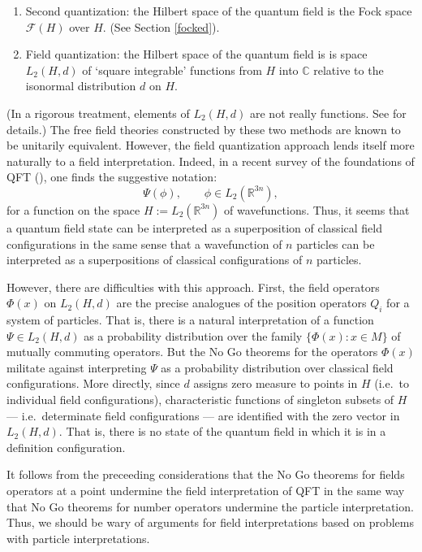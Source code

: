 \documentclass[12pt]{article}
\theoremstyle{definition}
\theoremstyle{definition}
\theoremstyle{remark}
\def\2#1{{\mathcal #1}}
\def\7#1{{\mathbb #1}}
\begin{document}
\begin{enumerate}
\item Second quantization: the Hilbert space of the quantum field is
  the Fock space $\2F (H)$ over $H$.  (See Section \ref{focked}).
\item Field quantization: the Hilbert space of the quantum field is is
  space $L_2(H ,d)$ of `square integrable' functions from $H$ into
  $\7C$ relative to the isonormal distribution $d$ on $H$.

\end{enumerate}
(In a rigorous treatment, elements of $L_2(H,d )$ are not really
functions.  See \cite[Section 1.3]{baez} for details.)  The free field
theories constructed by these two methods are known to be unitarily
equivalent.  However, the field quantization approach lends itself
more naturally to a field interpretation.  Indeed, in a recent survey
of the foundations of QFT (\cite{nhug}), one finds the suggestive
notation:
\[ \Psi (\phi ),\qquad \phi \in L_2(\7R ^{3n}) ,\] for a function on
the space $H:=L_2(\7R ^{3n})$ of wavefunctions. Thus, it seems that a
quantum field state can be interpreted as a superposition of classical
field configurations in the same sense that a wavefunction of $n$
particles can be interpreted as a superpositions of classical
configurations of $n$ particles.

However, there are difficulties with this approach.  First, the field
operators $\Phi (x)$ on $L_2(H ,d)$ are the precise analogues of the
position operators $Q_i$ for a system of particles.  That is, there is
a natural interpretation of a function $\Psi \in L_2(H, d)$ as a
probability distribution over the family $\{ \Phi (x):x\in M\}$ of
mutually commuting operators.  But the No Go theorems for the
operators $\Phi (x)$ militate against interpreting $\Psi$ as a
probability distribution over classical field configurations.  More
directly, since $d$ assigns zero measure to points in $H$ (i.e.\ to
individual field configurations), characteristic functions of
singleton subsets of $H$ --- i.e.\ determinate field configurations
--- are identified with the zero vector in $L_2(H ,d)$.  That is,
there is no state of the quantum field in which it is in a definition
configuration.

It follows from the preceeding considerations that the No Go theorems
for fields operators at a point undermine the field interpretation of
QFT in the same way that No Go theorems for number operators undermine
the particle interpretation.  Thus, we should be wary of arguments for
field interpretations based on problems with particle interpretations.    
\end{document}
